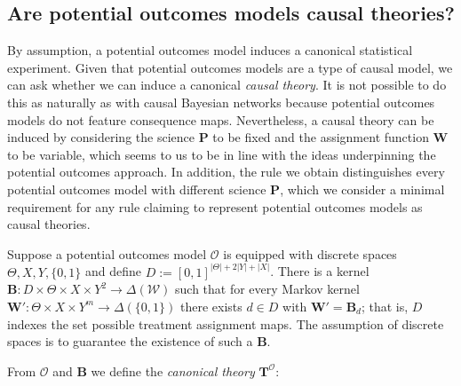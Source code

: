 
\subsection{Are potential outcomes models causal theories?}

By assumption, a potential outcomes model induces a canonical statistical experiment. Given that potential outcomes models are a type of causal model, we can ask whether we can induce a canonical \emph{causal theory}. It is not possible to do this as naturally as with causal Bayesian networks because potential outcomes models do not feature consequence maps. Nevertheless, a causal theory can be induced by considering the science $\mathbf{P}$ to be fixed and the assignment function $\mathbf{W}$ to be variable, which seems to us to be in line with the ideas underpinning the potential outcomes approach. In addition, the rule we obtain distinguishes every potential outcomes model with different science $\mathbf{P}$, which we consider a minimal requirement for any rule claiming to represent potential outcomes models as causal theories.

Suppose a potential outcomes model $\mathscr{O}$ is equipped with discrete spaces $\Theta,X,Y,\{0,1\}$ and define $D:=[0,1]^{|\Theta|+2|Y|+|X|}$. There is a kernel $\mathbf{B}:D\times\Theta\times X \times Y^2\to \Delta(\mathcal{W})$ such that for every Markov kernel $\mathbf{W}':\Theta\times X\times Y^m\to \Delta(\{0,1\})$ there exists $d\in D$ with $\mathbf{W}'=\mathbf{B}_d$; that is, $D$ indexes the set possible treatment assignment maps. The assumption of discrete spaces is to guarantee the existence of such a $\mathbf{B}$.

From $\mathscr{O}$ and $\mathbf{B}$ we define the \emph{canonical theory} $\mathbf{T}^{\mathscr{O}}$:

